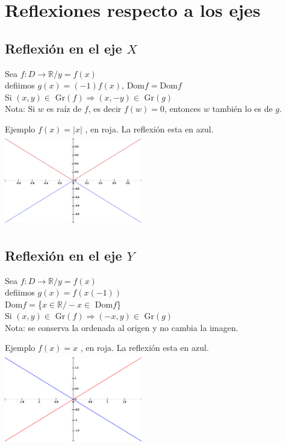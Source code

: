 \section{Reflexiones respecto a los ejes}
\subsection{Reflexión en el eje $X$}
\hfill
\begin{minipage}{.45\textwidth}
Sea $f: D \longrightarrow \mathbb{R}/ y=f(x)$\\
defiimos $g(x)= (-1) f(x)$, Dom$f=$Dom$f$\\
Si $(x, y) \in $ Gr$(f) \Rightarrow (x, -y) \in $ Gr$(g)$\\

Nota: Si $w$ es raíz de $f$, es decir $f(w)=0$, entonces $w$ también lo es de $g$.
\end{minipage}
\hfill
\begin{minipage}{.45\textwidth}
\begin{center}
Ejemplo $f(x)=|x|$ , en roja. La reflexión esta en azul. 
\includegraphics[height=4cm,width=6cm]{refx.eps} 
\end{center} 
\end{minipage}
\hfill
\subsection{Reflexión en el eje $Y$}
\hfill
\begin{minipage}{.45\textwidth}
Sea $f: D \longrightarrow \mathbb{R}/ y=f(x)$\\
defiimos $g(x)=  f(x(-1))$\\
Dom$f=$\{$x \in \mathbb{R} / -x \in $ Dom$f$\} \\
Si $(x, y) \in $ Gr$(f) \Rightarrow (-x, y) \in $ Gr$(g)$\\

Nota: se conserva la ordenada al origen y no cambia la imagen.
\end{minipage}
\hfill
\begin{minipage}{.45\textwidth}
\begin{center}
Ejemplo $f(x)=x$ , en roja. La reflexión esta en azul. 
\includegraphics[height=4cm,width=6cm]{refy.eps} 
\end{center} 
\end{minipage}
\hfill
